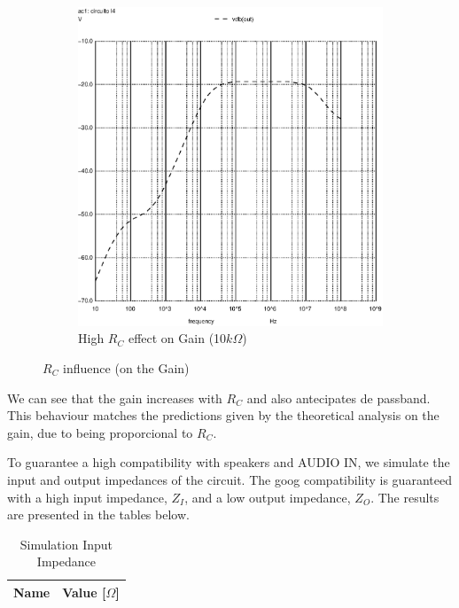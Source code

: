 \begin{figure}[h]
\begin{subfigure}{.5\textwidth}
    \includegraphics[scale=0.33]{images/rchigh_100k.eps}
    \caption{High $R_C$ effect on Gain (10$k\Omega$)}
    \label{fig:RC_High}
\end{subfigure}
\caption{$R_C$ influence (on the Gain)}
\end{figure}

We can see that the gain increases with $R_C$ and also antecipates de passband. This behaviour matches the predictions given by the theoretical analysis on the gain, due to being proporcional to $R_C$.

To guarantee a high compatibility with speakers and AUDIO IN, we simulate the input and output impedances of the circuit. The goog compatibility is guaranteed with a high input impedance, $Z_I$, and a low output impedance, $Z_O$. The results are presented in the tables below.

\begin{table}[h]
    \centering
    \begin{tabular}{|l|c|}
    \hline
    {\bf Name} & {\bf Value [$\Omega$]} \\ \hline
    
    \end{tabular}
    \caption{Simulation Input Impedance}
    \label{tab:simulation_input_imp}
\end{table}


